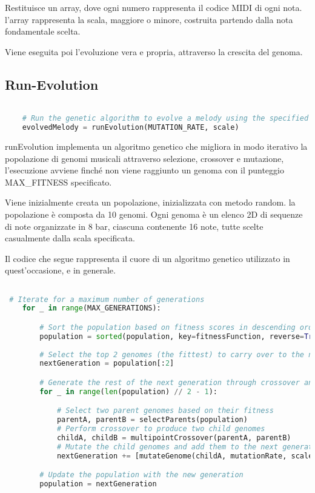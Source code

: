 \documentclass[a4paper,12pt]{report}
\begin{document}
Restituisce un array, dove ogni numero rappresenta il codice MIDI di ogni nota. l'array rappresenta la scala, maggiore o minore, costruita partendo dalla nota fondamentale scelta.

Viene eseguita poi l'evoluzione vera e propria, attraverso la crescita del genoma.

\subsection{Run-Evolution}

\begin{lstlisting}[language=Python]

    # Run the genetic algorithm to evolve a melody using the specified mutation rate and scale
    evolvedMelody = runEvolution(MUTATION_RATE, scale)

\end{lstlisting}

runEvolution implementa un algoritmo genetico che migliora in modo iterativo la popolazione di genomi musicali attraverso selezione, crossover e mutazione, l'esecuzione avviene finché non viene raggiunto un genoma con il punteggio MAX_FITNESS specificato.

Viene inizialmente creata un popolazione, inizializzata con metodo random. la popolazione è composta da 10 genomi. Ogni genoma è un elenco 2D di sequenze di note organizzate in 8 bar, ciascuna contenente 16 note, tutte scelte casualmente dalla scala specificata.

Il codice che segue rappresenta il cuore di un algoritmo genetico utilizzato in quest'occasione, e in generale.

\begin{lstlisting}[language=Python]

 # Iterate for a maximum number of generations
    for _ in range(MAX_GENERATIONS):

        # Sort the population based on fitness scores in descending order
        population = sorted(population, key=fitnessFunction, reverse=True)
        
        # Select the top 2 genomes (the fittest) to carry over to the next generation
        nextGeneration = population[:2]

        # Generate the rest of the next generation through crossover and mutation
        for _ in range(len(population) // 2 - 1):

            # Select two parent genomes based on their fitness
            parentA, parentB = selectParents(population)
            # Perform crossover to produce two child genomes
            childA, childB = multipointCrossover(parentA, parentB)
            # Mutate the child genomes and add them to the next generation
            nextGeneration += [mutateGenome(childA, mutationRate, scale), mutateGenome(childB, mutationRate, scale)]

        # Update the population with the new generation
        population = nextGeneration
        
\end{lstlisting}
\end{document}
